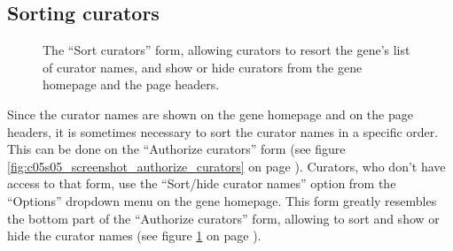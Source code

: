 \documentclass[a4paper,oneside,openany,12pt]{memoir}
\renewenvironment{leftbar}[1][\hsize]
{%
    \def\FrameCommand
    {%
        {\color{LOVDdark}\vrule width 3pt \hspace{5pt}}%
        \colorbox{LOVDlight}%
    }%
    \MakeFramed{\hsize#1\advance\hsize-\width\FrameRestore}%
}
{\endMakeFramed}
\begin{document}
\subsection{Sorting curators}

\begin{figure}[h]
  \begin{shaded}
  \caption{%
    The ``Sort curators'' form, allowing curators to resort the gene's list of curator names,
     and show or hide curators from the gene homepage and the page headers.}
  \label{fig:c05s05_screenshot_sort_curators}
  \end{shaded}
\end{figure}

Since the curator names are shown on the gene homepage and on the page headers, it is sometimes necessary to sort the curator names in a specific order.
This can be done on the ``Authorize curators'' form (see figure \ref{fig:c05s05_screenshot_authorize_curators}
 on page \pageref{fig:c05s05_screenshot_authorize_curators}).
Curators, who don't have access to that form, use the ``Sort/hide curator names'' option from the ``Options'' dropdown menu on the gene homepage.
This form greatly resembles the bottom part of the ``Authorize curators'' form, allowing to sort and show or
 hide the curator names (see figure \ref{fig:c05s05_screenshot_sort_curators} on page \pageref{fig:c05s05_screenshot_sort_curators}).
\end{document}
